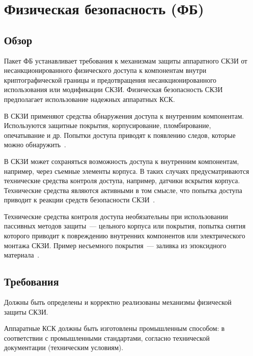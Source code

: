 \section{Физическая безопасность (ФБ)}\label{PS}

\subsection{Обзор}\label{PS.Intro}

Пакет ФБ устанавливает требования к механизмам защиты аппаратного СКЗИ 
от несанкционированного физического доступа к компонентам внутри 
криптографической границы и предотвращения несанкционированного использования 
или модификации СКЗИ.
%
Физическая безопасность СКЗИ предполагает использование надежных аппаратных 
КСК. 

В СКЗИ применяют средства обнаружения доступа к внутренним компонентам.
%
Используются защитные покрытия, корпусирование, пломбирование, опечатывание и др. 
%
Попытки доступа приводят к появлению следов, которые можно 
обнаружить~. 

В СКЗИ может сохраняться возможность доступа к внутренним компонентам,
например, через съемные элементы корпуса. В таких случаях предусматриваются
технические средства контроля доступа, например, датчики вскрытия корпуса.
%
Технические средства являются активными в том смысле, что попытка доступа
приводит к реакции средств безопасности СКЗИ~.

Технические средства контроля доступа необязательны при использовании пассивных
методов защиты~--- цельного корпуса или покрытия, попытка снятия которого 
приводит к повреждению внутренних компонентов или электрического монтажа СКЗИ. 
%
Пример несъемного покрытия~--- заливка из эпоксидного 
материала~.

\subsection{Требования}\label{PS.Reqs}

\label{R.PS.List}
Должны быть определены и корректно реализованы механизмы физической защиты СКЗИ. 

\label{R.PS.Production}
Аппаратные КСК должны быть изготовлены промышленным способом: в соответствии с 
промышленными стандартами, согласно технической документации (техническим 
условиям).

